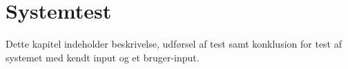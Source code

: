 \chapter{Systemtest}
Dette kapitel indeholder beskrivelse, udførsel af test samt konklusion for test af systemet med kendt input og et bruger-input. 



